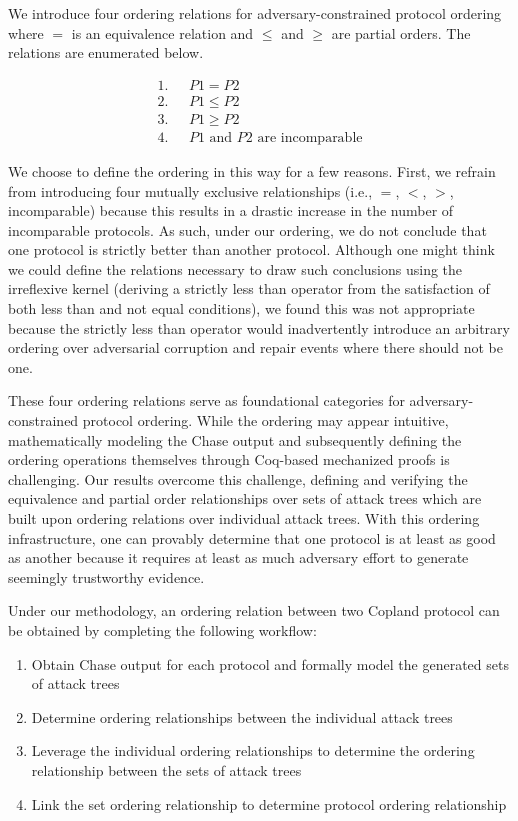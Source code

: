 \documentclass[runningheads]{llncs}
\theoremstyle{definition}
\newcommand{\squash}{\itemsep=0pt\parskip=0pt}
\begin{document}
We introduce four ordering relations for adversary-constrained protocol ordering where $=$ is an equivalence relation and $\le$ and $\ge$ are partial orders. The relations are enumerated below.

\vspace*{-5mm}

\begin{align*}
1. & \text{ } P1 = P2 \\
2. & \text{ } P1 \le P2 \\
3. & \text{ } P1 \ge P2 \\
4. & \text{ } P1 \text{ and } P2 \text{ are incomparable}
\end{align*}

\noindent We choose to define the ordering in this way for a few reasons. First, we refrain from introducing four mutually exclusive relationships (i.e., $=$, $<$, $>$, incomparable) because this results in a drastic increase in the number of incomparable protocols. As such, under our ordering, we do not conclude that one protocol is strictly better than another protocol. Although one might think we could define the relations necessary to draw such conclusions using the irreflexive kernel (deriving a strictly less than operator from the satisfaction of both less than and not equal conditions), we found this was not appropriate because the strictly less than operator would inadvertently introduce an arbitrary ordering over adversarial corruption and repair events where there should not be one.  


These four ordering relations serve as foundational categories for adversary-constrained protocol ordering. While the ordering may appear intuitive, mathematically modeling the Chase output and subsequently defining the ordering operations themselves through Coq-based mechanized proofs is challenging. Our results overcome this challenge, defining and verifying the equivalence and partial order relationships over sets of attack trees which are built upon ordering relations over individual attack trees. With this ordering infrastructure, one can provably determine that one protocol is at least as good as another because it requires at least as much adversary effort to generate seemingly trustworthy evidence. 

Under our methodology, an ordering relation between two Copland protocol can be obtained by completing the following workflow:

\begin{enumerate}
    \squash
    \item Obtain Chase output for each protocol and formally model the generated sets of attack trees
    \item Determine ordering relationships between the individual attack trees
    \item Leverage the individual ordering relationships to determine the ordering relationship between the sets of attack trees
    \item Link the set ordering relationship to determine protocol ordering relationship
\end{enumerate}
\end{document}
